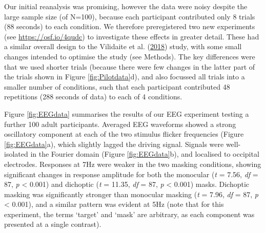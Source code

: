\documentclass[
]{article}
\begin{document}
Our initial reanalysis was promising, however the data were noisy despite the large sample size (of N=100), because each participant contributed only 8 trials (88 seconds) to each condition. We therefore preregistered two new experiments (see \url{https://osf.io/4qudc}) to investigate these effects in greater detail. These had a similar overall design to the Vilidaite et al. (\protect\hyperlink{ref-Vilidaite2018}{2018}) study, with some small changes intended to optimise the study (see Methods). The key differences were that we used shorter trials (because there were few changes in the latter part of the trials shown in Figure \ref{fig:Pilotdata}d), and also focussed all trials into a smaller number of conditions, such that each participant contributed 48 repetitions (288 seconds of data) to each of 4 conditions.

Figure \ref{fig:EEGdata} summarises the results of our EEG experiment testing a further 100 adult participants. Averaged EEG waveforms showed a strong oscillatory component at each of the two stimulus flicker frequencies (Figure \ref{fig:EEGdata}a), which slightly lagged the driving signal. Signals were well-isolated in the Fourier domain (Figure \ref{fig:EEGdata}b), and localised to occipital electrodes. Responses at 7Hz were weaker in the two masking conditions, showing significant changes in response amplitude for both the monocular (\emph{t} = 7.56, \emph{df} = 87, \emph{p} \textless{} 0.001) and dichoptic (\emph{t} = 11.35, \emph{df} = 87, \emph{p} \textless{} 0.001) masks. Dichoptic masking was significantly stronger than monocular masking (\emph{t} = 7.96, \emph{df} = 87, \emph{p} \textless{} 0.001), and a similar pattern was evident at 5Hz (note that for this experiment, the terms `target' and `mask' are arbitrary, as each component was presented at a single contrast).
\end{document}
